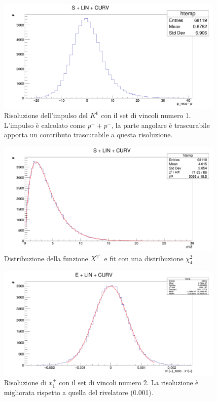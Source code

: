 \documentclass[8pt]{extarticle}
\begin{document}
\begin{figure}
	\begin{center}
		\includegraphics[scale=0.25]{set_1_p} 
		\caption{Risoluzione dell'impulso del $K^0$ con il set di vincoli numero 1. L'impulso è calcolato come $p^+ + p^-$, la parte angolare è trascurabile apporta un contributo trascurabile a questa risoluzione.}
		\label{fig:set_1_p}
	\end{center}
\end{figure}

\begin{figure}
	\begin{center}
		\includegraphics[scale=0.25]{set_1_chi2} 
		\caption{Distribuzione della funzione $X^2^+$ e fit con una distribuzione $\chi^2_4$}
		\label{fig:set_1_chi2}
	\end{center}
\end{figure}

\begin{figure}
	\begin{center}
		\includegraphics[scale=0.25]{set_2_x} 
		\caption{Risoluzione di $x_1^+$ con il set di vincoli numero 2. La risoluzione è migliorata rispetto a quella del rivelatore (0.001).}
		\label{fig:set_2_x}
	\end{center}
\end{figure}
\end{document}
